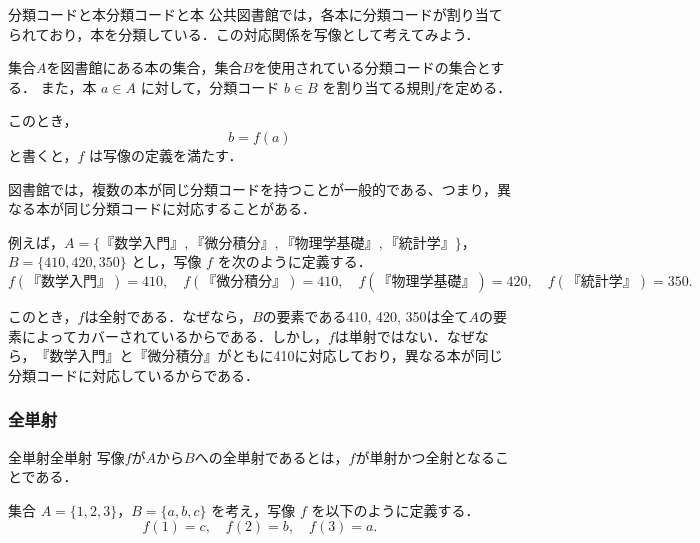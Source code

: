 \documentclass[a4paper,11pt]{ltjsarticle}
\begin{document}
\begin{example}{分類コードと本}{分類コードと本}
  公共図書館では，各本に分類コードが割り当てられており，本を分類している．この対応関係を写像として考えてみよう．

  集合$A$を図書館にある本の集合，集合$B$を使用されている分類コードの集合とする．
  また，本 $a \in A$ に対して，分類コード $b \in B$ を割り当てる規則$f$を定める．

  このとき，
  \[
    b = f(a)
  \]
  と書くと，$f$ は写像の定義を満たす．

  図書館では，複数の本が同じ分類コードを持つことが一般的である、つまり，異なる本が同じ分類コードに対応することがある．

  例えば，$A = \{\text{『数学入門』}, \text{『微分積分』}, \text{『物理学基礎』}, \text{『統計学』}\}$，
  $B = \{\text{410}, \text{420}, \text{350}\}$ とし，写像 $f$ を次のように定義する．
  \[
    f(\text{『数学入門』}) = 410, \quad
    f(\text{『微分積分』}) = 410, \quad
    f(\text{『物理学基礎』}) = 420, \quad
    f(\text{『統計学』}) = 350.
  \]

  このとき，$f$は全射である．なぜなら，$B$の要素である410, 420, 350は全て$A$の要素によってカバーされているからである．しかし，$f$は単射ではない．なぜなら，$\text{『数学入門』}$と$\text{『微分積分』}$がともに410に対応しており，異なる本が同じ分類コードに対応しているからである．

\end{example}


\subsubsection{全単射}

\begin{definition}{全単射}{全単射}
  写像$f$が$A$から$B$への全単射であるとは，$f$が単射かつ全射となることである．
\end{definition}

集合 $A = \{1, 2, 3\}$，$B = \{a, b, c\}$ を考え，写像 $f$ を以下のように定義する．
\[
  f(1) = c, \quad f(2) = b, \quad f(3) = a.
\]
\end{document}
